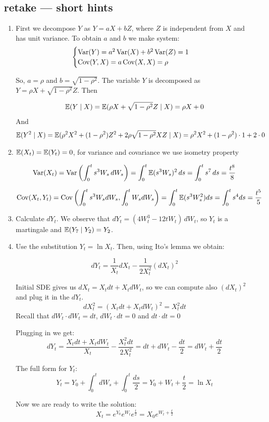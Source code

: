 \documentclass[12pt, a4paper]{article}
\begin{document}
\subsection{retake — short hints}
\begin{enumerate}
\item First we decompose $Y$ as $Y=aX+bZ$, where $Z$ is independent from $X$ and has unit variance. To obtain $a$ and $b$ we make system:
\[
\begin{cases}
\operatorname{Var}(Y)=a^2\operatorname{Var}(X)+b^2\operatorname{Var}(Z)=1 \\
\operatorname{Cov}(Y,X)=a\operatorname{Cov}(X,X)=\rho
\end{cases}
\]

So, $a=\rho$ and $b=\sqrt{1-\rho^2}$. The variable $Y$ is decomposed as $Y=\rho X + \sqrt{1-\rho^2}Z$. Then

\[
\operatorname{\mathbb{E}}(Y \mid X)=\operatorname{\mathbb{E}}(\rho X + \sqrt{1-\rho^2}Z \mid X)=\rho X + 0
\]
And
\[
\operatorname{\mathbb{E}}(Y^2 \mid X)=\operatorname{\mathbb{E}}(\rho^2 X^2 + (1-\rho^2)Z^2 + 2 \rho \sqrt{1-\rho^2} XZ \mid X)=\rho^2 X^2 +  (1-\rho^2)\cdot 1 + 2\cdot 0
\]


\item $\operatorname{\mathbb{E}}(X_t)=\operatorname{\mathbb{E}}(Y_t)=0$, for variance and covariance we use isometry property

\[
\operatorname{Var}(X_{t})=\operatorname{Var}\left(\int_0^{t}s^{3}W_{s}\,dW_{s}\right)=\int_0^{t}\operatorname{\mathbb{E}}(s^{3}W_{s})^{2}\,ds=\int_0^{t}s^{7}\,ds=\frac{t^{8}}{8}
\]

\[ \operatorname{Cov}(X_{t},Y_{t})=\operatorname{Cov}\left(\int_0^{t}s^{3}W_{s}dW_{s}, \int_0^{t}W_{s}dW_{s}\right)=\int_0^{t}\operatorname{\mathbb{E}}(s^3W_{s}^{2})ds=\int_0^{t}s^{4}ds=\frac{t^{5}}{5}
\]

\item Calculate  $dY_t$. We observe that $dY_t=(4W_t^3 - 12t W_t) \, dW_t$, so $Y_t$ is a martingale and $\operatorname{\mathbb{E}}(Y_7 \mid Y_2)=Y_2$.
\item Use the substitution $Y_t=\ln X_t$. Then, using Ito's lemma we obtain:

\[
dY_{t}=\frac{1}{X_{t}}dX_{t}-\frac{1}{2X_{t}^{2}}(dX_{t})^2
\]

Initial SDE gives us $dX_{t}=X_{t}dt+X_{t}dW_{t}$, so we can compute also $(dX_{t})^{2}$ and plug it in the $dY_{t}$.
\[
dX_{t}^{2}=(X_{t}dt+X_{t}dW_{t})^{2}=X_{t}^{2}dt
\]
Recall that $dW_{t}\cdot dW_{t}=dt$, $dW_{t}\cdot dt=0$ and $dt\cdot dt=0$

Plugging in we get:
\[ dY_{t}=\frac{X_{t}dt+X_{t}dW_{t}}{X_{t}}-\frac{X_{t}^{2}dt}{2X_{t}^{2}}=dt+dW_{t}-\frac{dt}{2}=dW_{t}+\frac{dt}{2}
\]

The full form for $Y_{t}$:
\[
Y_{t}=Y_{0}+\int_0^{t}dW_s+\int_0^{t}\frac{ds}{2}=Y_{0}+W_{t}+\frac{t}{2}=\ln{X_{t}}
\]

Now we are ready to write the solution:
\[
X_{t}=e^{Y_{0}}e^{W_{t}}e^{\frac{t}{2}}=X_{0}e^{W_{t}+\frac{t}{2}}
\]


\end{enumerate}
\end{document}
